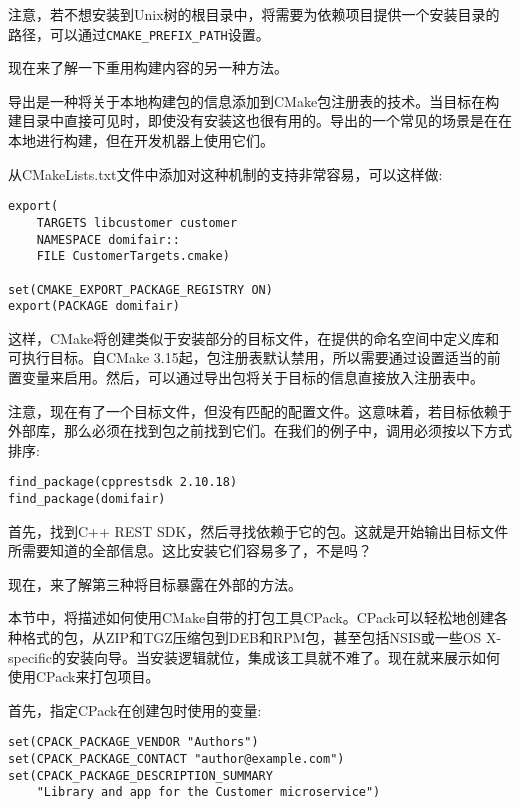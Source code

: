 注意，若不想安装到Unix树的根目录中，将需要为依赖项目提供一个安装目录的路径，可以通过\texttt{CMAKE\_PREFIX\_PATH}设置。

现在来了解一下重用构建内容的另一种方法。


导出是一种将关于本地构建包的信息添加到CMake包注册表的技术。当目标在构建目录中直接可见时，即使没有安装这也很有用的。导出的一个常见的场景是在在本地进行构建，但在开发机器上使用它们。

从CMakeLists.txt文件中添加对这种机制的支持非常容易，可以这样做:

\begin{lstlisting}[style=styleCMake]
export(
	TARGETS libcustomer customer
	NAMESPACE domifair::
	FILE CustomerTargets.cmake)

set(CMAKE_EXPORT_PACKAGE_REGISTRY ON)
export(PACKAGE domifair)
\end{lstlisting}

这样，CMake将创建类似于安装部分的目标文件，在提供的命名空间中定义库和可执行目标。自CMake 3.15起，包注册表默认禁用，所以需要通过设置适当的前置变量来启用。然后，可以通过导出包将关于目标的信息直接放入注册表中。

注意，现在有了一个目标文件，但没有匹配的配置文件。这意味着，若目标依赖于外部库，那么必须在找到包之前找到它们。在我们的例子中，调用必须按以下方式排序:

\begin{lstlisting}[style=styleCMake]
find_package(cpprestsdk 2.10.18)
find_package(domifair)
\end{lstlisting}

首先，找到C++ REST SDK，然后寻找依赖于它的包。这就是开始输出目标文件所需要知道的全部信息。这比安装它们容易多了，不是吗？

现在，来了解第三种将目标暴露在外部的方法。


本节中，将描述如何使用CMake自带的打包工具CPack。CPack可以轻松地创建各种格式的包，从ZIP和TGZ压缩包到DEB和RPM包，甚至包括NSIS或一些OS X-specific的安装向导。当安装逻辑就位，集成该工具就不难了。现在就来展示如何使用CPack来打包项目。

首先，指定CPack在创建包时使用的变量:

\begin{lstlisting}[style=styleCMake]
set(CPACK_PACKAGE_VENDOR "Authors")
set(CPACK_PACKAGE_CONTACT "author@example.com")
set(CPACK_PACKAGE_DESCRIPTION_SUMMARY
	"Library and app for the Customer microservice")
\end{lstlisting}

